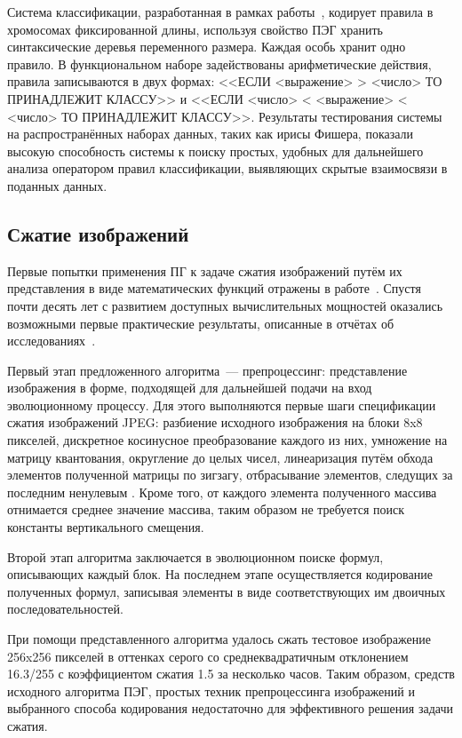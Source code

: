 Система классификации, разработанная в рамках работы~\cite{Dehuri:2008:MCR:1471604.1472090}, кодирует правила в хромосомах фиксированной длины, используя свойство ПЭГ хранить синтаксические деревья переменного размера. Каждая особь хранит одно правило. В функциональном наборе задействованы арифметические действия, правила записываются в двух формах: <<ЕСЛИ <выражение> > <число> ТО ПРИНАДЛЕЖИТ КЛАССУ>> и <<ЕСЛИ <число> < <выражение> < <число> ТО ПРИНАДЛЕЖИТ КЛАССУ>>. Результаты тестирования системы на распространённых наборах данных, таких как ирисы Фишера, показали высокую способность системы к поиску простых, удобных для дальнейшего анализа оператором правил классификации, выявляющих скрытые взаимосвязи в поданных данных.


\subsection{Сжатие изображений}

Первые попытки применения ПГ к задаче сжатия изображений путём их представления в виде математических функций отражены в работе~\cite{fukunaga1998evolving}. Спустя почти десять лет с развитием доступных вычислительных мощностей оказались возможными первые практические результаты, описанные в отчётах об исследованиях~\cite{techrep/Ashworth06, techrep/Gempeler06}.

Первый этап предложенного алгоритма~--- препроцессинг: представление изображения в форме, подходящей для дальнейшей подачи на вход эволюционному процессу. Для этого выполняются первые шаги спецификации сжатия изображений JPEG: разбиение исходного изображения на блоки 8x8 пикселей, дискретное косинусное преобразование каждого из них, умножение на матрицу квантования, округление до целых чисел, линеаризация путём обхода элементов полученной матрицы по зигзагу, отбрасывание элементов, следущих за последним ненулевым \cite{jpeg1993}. Кроме того, от каждого элемента полученного массива отнимается среднее значение массива, таким образом не требуется поиск константы вертикального смещения.

Второй этап алгоритма заключается в эволюционном поиске формул, описывающих каждый блок. На последнем этапе осуществляется кодирование полученных формул, записывая элементы в виде соответствующих им двоичных последовательностей.

При помощи представленного алгоритма удалось сжать тестовое изображение 256x256 пикселей в оттенках серого со среднеквадратичным отклонением 16.3/255 с коэффициентом сжатия 1.5 за несколько часов. Таким образом, средств исходного алгоритма ПЭГ, простых техник препроцессинга изображений и выбранного способа кодирования недостаточно для эффективного решения задачи сжатия.

